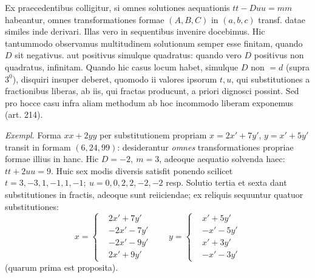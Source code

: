 Ex praecedentibus colligitur, si omnes solutiones aequationis \(tt-Duu=mm\) habeantur, omnes transformationes formae \((A,B,C)\) in \((a,b,c)\) transf. datae similes inde derivari. Illas vero in sequentibus invenire docebimus. Hic tantummodo observamus multitudinem solutionum semper esse finitam, quando \(D\) sit negativus. aut positivus simulque quadratus: quando vero \(D\) positivus non quadratus, infinitam. Quando hic casus locum habet, simulque \(D\) non \(=d\) (supra \(3^0\)), disquiri insuper deberet, quomodo ii valores ipsorum \(t,u\), qui substitutiones a fractionibus liberas, ab iis, qui fractas producunt, a priori dignosci possint. Sed pro hocce casu infra aliam methodum ab hoc incommodo liberam exponemus (art. 214).

\textit{Exempl.} Forma \(xx+2yy\) per substitutionem propriam \(x=2x'+7y'\), \(y=x'+5y'\) transit in formam \((6,24,99)\): desiderantur \textit{omnes} transformationes propriae formae illius in hanc. Hic \(D=-2,\ m=3\), adeoque aequatio solvenda haec: \(tt+2uu=9\). Huic sex modis diversis satisfit ponendo scilicet \(t=3,-3,1,-1,1,-1;\ u=0,0,2,2,-2,-2\) resp. Solutio tertia et sexta dant substitutiones in fractis, adeoque sunt reiiciendae; ex reliquis sequuntur quatuor substitutiones:
\[
x=\left\{\begin{aligned}
&2x'+7y'\\
&-2x'-7y'\\
&-2x'-9y'\\
&2x'+9y'
\end{aligned}\right.
\qquad
y=\left\{\begin{aligned}
&x'+5y'\\
&-x'-5y'\\
&x'+3y'\\
&-x'-3y'
\end{aligned}\right.
\]
(quarum prima est proposita).

